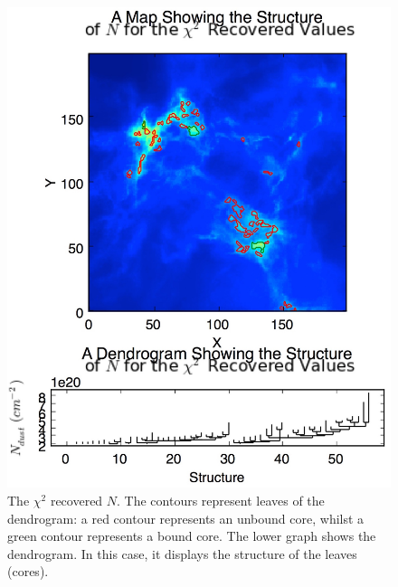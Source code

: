 \documentclass{report}
\begin{document}
\begin{figure}[H]
  \includegraphics[width=\linewidth]{../img/N_chi_inp.jpg}
  \caption{The $\chi^{2}$ recovered $N$. The contours represent leaves of the dendrogram: a red contour represents an unbound core, whilst a green contour represents a bound core. The lower graph shows the dendrogram. In this case, it displays the structure of the leaves (cores).}\label{fig:chi_dendro}
\endminipage\hfill
{}

\end{figure}
\end{document}
